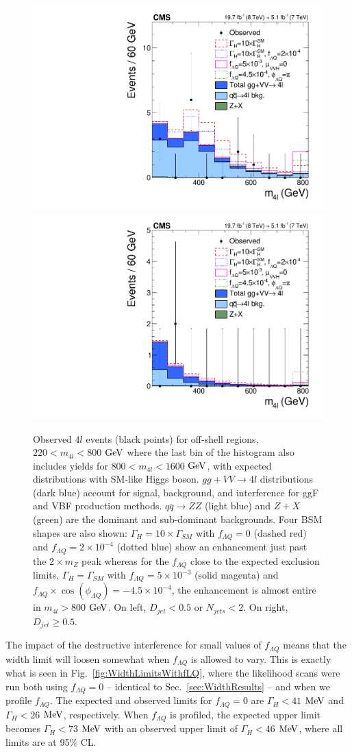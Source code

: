 \begin{figure}[htbp]
\begin{center}
\includegraphics[width=.45\linewidth]{HiggsProperties/figures/nonDjet_m4l_Enhanced_Dgg0p67.pdf}
\includegraphics[width=.45\linewidth]{HiggsProperties/figures/Djet_m4l.pdf}
\caption[$m_{4l}$ Distributions of Jet Categorized Expected and Observed $4l$ Events in the Off-Shell Region for $f_{\Lambda Q}$ Measurement]{Observed $4l$ events (black points) for off-shell regions, $220<m_{4l}<800$ $\rm{GeV}$ where the last bin of the histogram also includes yields for $800<m_{4l}<1600$ $\rm{GeV}$, with expected distributions with SM-like Higgs boson. $gg + VV \rightarrow 4l$ distributions (dark blue) account for signal, background, and interference for ggF and VBF production methods. $q\bar{q}\rightarrow ZZ$ (light blue) and $Z+X$ (green) are the dominant and sub-dominant backgrounds. Four BSM shapes are also shown: $\Gamma_H=10\times\Gamma_{SM}$ with $f_{\Lambda Q}=0$ (dashed red) and $f_{\Lambda Q}=2\times10^{-4}$ (dotted blue) show an enhancement just past the $2\times m_{Z}$ peak whereas for the $f_{\Lambda Q}$ close to the expected exclusion limits, $\Gamma_{H}=\Gamma_{SM}$ with $f_{\Lambda Q}=5\times10^{-3}$ (solid magenta) and $f_{\Lambda Q}\times\cos(\phi_{\Lambda Q})=-4.5\times10^{-4}$, the enhancement is almost entire in $m_{4l}>800$ $\rm{GeV}$. On left, $D_{jet}<0.5$ or $N_{jets}<2$. On right, $D_{jet}\geq0.5$.}
\label{fig:OffShell_Categorized}
\end{center}
\end{figure}

The impact of the destructive interference for small values of $f_{\Lambda Q}$ means that the width limit will loosen somewhat when $f_{\Lambda Q}$ is allowed to vary. This is exactly what is seen in Fig.~\ref{fig:WidthLimitsWithfLQ}, where the likelihood scans were run both using $f_{\Lambda Q}=0$ -- identical to Sec.~\ref{sec:WidthResults} -- and when we profile $f_{\Lambda Q}$. The expected and observed limits for $f_{\Lambda Q}=0$ are $\Gamma_H < 41$ $\rm{MeV}$ and $\Gamma_H < 26$ $\rm{MeV}$, respectively. When $f_{\Lambda Q}$ is profiled, the expected upper limit becomes $\Gamma_H < 73$ $\rm{MeV}$ with an observed upper limit of $\Gamma_H < 46$ $\rm{MeV}$, where all limits are at 95\% CL.

